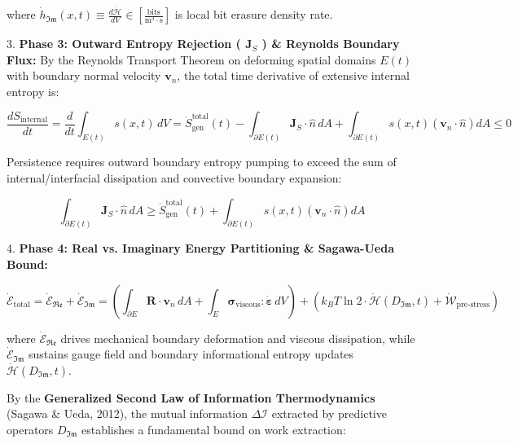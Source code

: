 \documentclass[11pt,a4paper]{article}
\theoremstyle{definition}\newtheorem{definition}{Definition}
\theoremstyle{remark}\newtheorem{remark}{Remark}
\begin{document}
where $\dot{h}_{\mathfrak{Im}}(x, t) \equiv \frac{d\dot{\mathcal{H}}}{dV} \in [\frac{\mathrm{bits}}{\mathrm{m^3 \cdot s}}]$ is local bit erasure density rate.

3. \textbf{Phase 3: Outward Entropy Rejection ( $\mathbf{J}_S$ ) \& Reynolds Boundary Flux:}
By the Reynolds Transport Theorem on deforming spatial domains $E(t)$ with boundary normal velocity $\mathbf{v}_n$, the total time derivative of extensive internal entropy is:


\begin{equation}
\boxed{\frac{dS_{\text{internal}}}{dt} = \frac{d}{dt} \int_{E(t)} s(x, t) \, dV = \dot{S}_{\text{gen}}^{\text{total}}(t) - \int_{\partial E(t)} \mathbf{J}_S \cdot \hat{n} \, dA + \int_{\partial E(t)} s(x, t) \left( \mathbf{v}_n \cdot \hat{n} \right) dA \le 0}
\end{equation}


Persistence requires outward boundary entropy pumping to exceed the sum of internal/interfacial dissipation and convective boundary expansion:


\begin{equation}
\int_{\partial E(t)} \mathbf{J}_S \cdot \hat{n} \, dA \ge \dot{S}_{\text{gen}}^{\text{total}}(t) + \int_{\partial E(t)} s(x, t) \left( \mathbf{v}_n \cdot \hat{n} \right) dA
\end{equation}


4. \textbf{Phase 4: Real vs. Imaginary Energy Partitioning \& Sagawa-Ueda Bound:}


\begin{equation}
\dot{\mathcal{E}}_{\text{total}} = \dot{\mathcal{E}}_{\mathfrak{Re}} + \dot{\mathcal{E}}_{\mathfrak{Im}} = \left( \int_{\partial E} \mathbf{R} \cdot \mathbf{v}_n \, dA + \int_E \boldsymbol{\sigma}_{\text{viscous}} : \dot{\boldsymbol{\varepsilon}} \, dV \right) + \left( k_B T \ln 2 \cdot \dot{\mathcal{H}}(D_{\mathfrak{Im}}, t) + \dot{\mathcal{W}}_{\text{pre-stress}} \right)
\end{equation}


where $\dot{\mathcal{E}}_{\mathfrak{Re}}$ drives mechanical boundary deformation and viscous dissipation, while $\dot{\mathcal{E}}_{\mathfrak{Im}}$ sustains gauge field and boundary informational entropy updates $\dot{\mathcal{H}}(D_{\mathfrak{Im}}, t)$.

By the \textbf{Generalized Second Law of Information Thermodynamics} (Sagawa \& Ueda, 2012), the mutual information $\Delta \mathcal{I}$ extracted by predictive operators $D_{\mathfrak{Im}}$ establishes a fundamental bound on work extraction:
\end{document}
